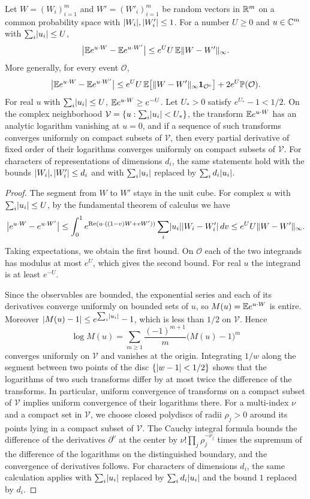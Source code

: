 \begin{lemma}\label{ch21:lem:exponential-transforms}
Let $W=(W_i)_{i=1}^m$ and $W'=(W'_i)_{i=1}^m$ be random vectors in $\mathbb R^m$ on a common probability space with $\lvert W_i\rvert,\lvert W'_i\rvert\le1$. For a number $U\ge0$ and $u\in\mathbb C^m$ with $\sum_i\lvert u_i\rvert\le U$,
\[
 \bigl\lvert\mathbb E e^{u\cdot W}-\mathbb E e^{u\cdot W'}\bigr\rvert\le e^{U}U\,\mathbb E\lVert W-W'\rVert_\infty .
\]
More generally, for every event $\mathcal O$,
\[
 \bigl\lvert\mathbb E e^{u\cdot W}-\mathbb E e^{u\cdot W'}\bigr\rvert\le e^{U}U\,\mathbb E\bigl[\lVert W-W'\rVert_\infty\mathbf 1_{\mathcal O^c}\bigr]+2e^{U}\mathbb P(\mathcal O).
\]
For real $u$ with $\sum_i\lvert u_i\rvert\le U$, $\mathbb E e^{u\cdot W}\ge e^{-U}$. Let $U_*>0$ satisfy $e^{U_*}-1<1/2$. On the complex neighborhood $\mathcal V=\{u:\sum_i\lvert u_i\rvert<U_*\}$, the transform $\mathbb E e^{u\cdot W}$ has an analytic logarithm vanishing at $u=0$, and if a sequence of such transforms converges uniformly on compact subsets of $\mathcal V$, then every partial derivative of fixed order of their logarithms converges uniformly on compact subsets of $\mathcal V$. For characters of representations of dimensions $d_i$, the same statements hold with the bounds $\lvert W_i\rvert,\lvert W'_i\rvert\le d_i$ and with $\sum_i\lvert u_i\rvert$ replaced by $\sum_id_i\lvert u_i\rvert$.
\end{lemma}

\begin{proof}
The segment from $W$ to $W'$ stays in the unit cube. For complex $u$ with $\sum_i\lvert u_i\rvert\le U$, by the fundamental theorem of calculus we have
\[
 \bigl\lvert e^{u\cdot W}-e^{u\cdot W'}\bigr\rvert\le\int_0^1e^{\operatorname{Re}(u\cdot((1-v)W+vW'))}\sum_i\lvert u_i\rvert\lvert W_i-W'_i\rvert\,dv\le e^{U}U\lVert W-W'\rVert_\infty .
\]
Taking expectations, we obtain the first bound. On $\mathcal O$ each of the two integrands has modulus at most $e^{U}$, which gives the second bound. For real $u$ the integrand is at least $e^{-U}$.

Since the observables are bounded, the exponential series and each of its derivatives converge uniformly on bounded sets of $u$, so $M(u)=\mathbb E e^{u\cdot W}$ is entire. Moreover $\lvert M(u)-1\rvert\le e^{\sum_i\lvert u_i\rvert}-1$, which is less than $1/2$ on $\mathcal V$. Hence
\[
 \log M(u)=\sum_{m\ge1}\frac{(-1)^{m+1}}m\bigl(M(u)-1\bigr)^m
\]
converges uniformly on $\mathcal V$ and vanishes at the origin. Integrating $1/w$ along the segment between two points of the disc $\{\lvert w-1\rvert<1/2\}$ shows that the logarithms of two such transforms differ by at most twice the difference of the transforms. In particular, uniform convergence of transforms on a compact subset of $\mathcal V$ implies uniform convergence of their logarithms there. For a multi-index $\nu$ and a compact set in $\mathcal V$, we choose closed polydiscs of radii $\rho_j>0$ around its points lying in a compact subset of $\mathcal V$. The Cauchy integral formula bounds the difference of the derivatives $\partial^\nu$ at the center by $\nu!\prod_j\rho_j^{-\nu_j}$ times the supremum of the difference of the logarithms on the distinguished boundary, and the convergence of derivatives follows. For characters of dimensions $d_i$, the same calculation applies with $\sum_i\lvert u_i\rvert$ replaced by $\sum_id_i\lvert u_i\rvert$ and the bound $1$ replaced by $d_i$.
\end{proof}

